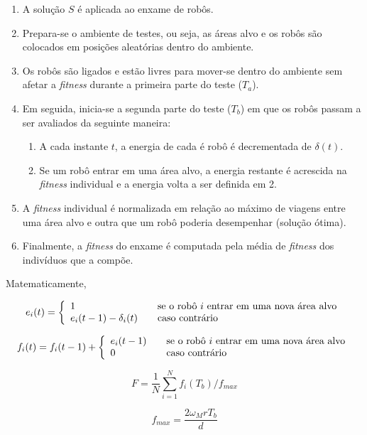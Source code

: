 \begin{enumerate}
    \item A solução $S$ é aplicada ao enxame de robôs.
    \item Prepara-se o ambiente de testes, ou seja, as áreas alvo e os robôs são colocados em posições aleatórias dentro do ambiente.
    \item Os robôs são ligados e estão livres para mover-se dentro do ambiente sem afetar a \textit{fitness} durante a primeira parte do teste ($T_{a}$).
    \item Em seguida, inicia-se a segunda parte do teste ($T_{b}$) em que os robôs passam a ser avaliados da seguinte maneira:
    \begin{enumerate}
        \item A cada instante $t$, a energia de cada é robô é decrementada de $\delta (t)$.
        \item Se um robô entrar em uma área alvo, a energia restante é acrescida na \textit{fitness} individual e a energia volta a ser definida em 2.
    \end{enumerate}
    \item A \textit{fitness} individual é normalizada em relação ao máximo de viagens entre uma área alvo e outra que um robô poderia desempenhar (solução ótima).
    \item Finalmente, a \textit{fitness} do enxame é computada pela média de \textit{fitness} dos indivíduos que a compõe.
\end{enumerate}

Matematicamente,

$$
e_{i} (t) = \left\{
\begin{array}{l l}
1 & \quad \text{se o robô $i$ entrar em uma nova área alvo}\\
e_{i}(t - 1) - \delta_{i} (t) & \quad \text{caso contrário}
\end{array} \right.
$$

$$
f_{i} (t) = f_{i} (t - 1) + \left\{
\begin{array}{l l}
e_{i}(t - 1) & \quad \text{se o robô $i$ entrar em uma nova área alvo}\\
0 & \quad \text{caso contrário}
\end{array} \right.
$$

\noindent\begin{minipage}{.5\linewidth}
$$
F = \frac{1}{N} \sum_{i=1}^{N} f_{i} (T_{b}) / f_{max}
$$
\end{minipage}%
\begin{minipage}{.5\linewidth}
$$
f_{max} = \frac{2 \omega_{M} r T_{b}}{d}
$$
\end{minipage}\\

